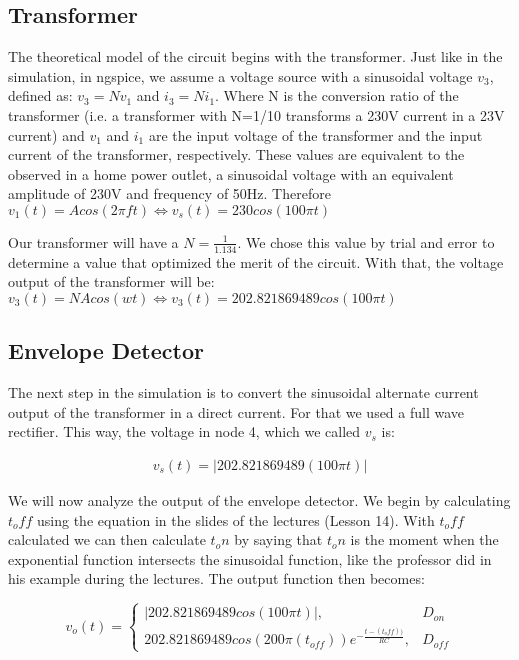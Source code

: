 \subsection{Transformer}
\hspace{12pt} The theoretical model of the circuit begins with the transformer. Just like in the simulation, in ngspice, we assume a voltage source with a sinusoidal voltage $v_3$, defined as: $v_3 = Nv_1$ and $i_3 = Ni_1$.
Where N is the conversion ratio of the transformer (i.e. a transformer with N=1/10 transforms a 230V current in a 23V current) and $v_1$ and $i_1$ are the input voltage of the transformer and the input current of the transformer, respectively. These values are equivalent to the observed in a home power outlet, a sinusoidal voltage with an equivalent amplitude of 230V and frequency of 50Hz. Therefore $v_1(t) = Acos(2\pi ft) \iff v_s(t) = 230cos(100\pi t)$

Our transformer will have a $N=\frac{1}{1.134}$. We chose this value by trial and error to determine a value that optimized the merit of the circuit. With that, the voltage output of the transformer will be: $v_3(t) = NAcos(wt) \iff v_3(t) = 202.821869489cos(100\pi t)$

\subsection{Envelope Detector}
\hspace{12pt}The next step in the simulation is to convert the sinusoidal alternate current output of the transformer in a direct current. For that we used a full wave rectifier. This way, the voltage in node 4, which we called $v_s$ is:

\vspace{-15pt}
\begin{gather}
    v_s(t) = |202.821869489(100\pi t)| \nonumber
\end{gather}

We will now analyze the output of the envelope detector. We begin by calculating $t_off$ using the equation in the slides of the lectures (Lesson 14). With $t_off$ calculated we can then calculate $t_on$ by saying that $t_on$ is the moment when the exponential function intersects the sinusoidal function, like the professor did in his example during the lectures. The output function then becomes:

\vspace{-8pt}
\[ 
v_o(t)= \left.
\begin{cases} 
	|202.821869489cos(100\pi t)|, & D_{on} \\
	202.821869489cos(200\pi (t_{off}))e^{-\frac{t-(t_off))}{RC}}, & D_{off}
\end{cases}
\right.
\]

